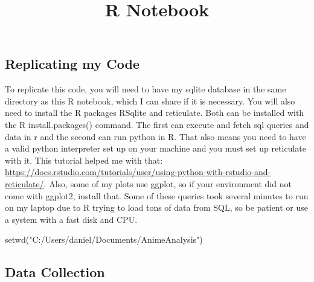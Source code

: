 \documentclass[
]{article}
\title{R Notebook}
\author{}
\date{\vspace{-2.5em}}
\newenvironment{Shaded}{\begin{snugshade}}{\end{snugshade}}
\newcommand{\FunctionTok}[1]{\textcolor[rgb]{0.00,0.00,0.00}{#1}}
\newcommand{\NormalTok}[1]{#1}
\newcommand{\StringTok}[1]{\textcolor[rgb]{0.31,0.60,0.02}{#1}}
\begin{document}
\maketitle

\hypertarget{replicating-my-code}{%
\subsection{Replicating my Code}\label{replicating-my-code}}

To replicate this code, you will need to have my sqlite database in the
same directory as this R notebook, which I can share if it is necessary.
You will also need to install the R packages RSqlite and reticulate.
Both can be installed with the R install.packages() command. The first
can execute and fetch sql queries and data in r and the second can run
python in R. That also means you need to have a valid python interpreter
set up on your machine and you must set up reticulate with it. This
tutorial helped me with that:
\url{https://docs.rstudio.com/tutorials/user/using-python-with-rstudio-and-reticulate/}.
Also, some of my plots use ggplot, so if your environment did not come
with ggplot2, install that. Some of these queries took several minutes
to run on my laptop due to R trying to load tons of data from SQL, so be
patient or use a system with a fast disk and CPU.

\begin{Shaded}
\begin{Highlighting}[]
\FunctionTok{setwd}\NormalTok{(}\StringTok{"C:/Users/daniel/Documents/AnimeAnalysis"}\NormalTok{)}
\end{Highlighting}
\end{Shaded}

\hypertarget{data-collection}{%
\subsection{Data Collection}\label{data-collection}}
\end{document}
